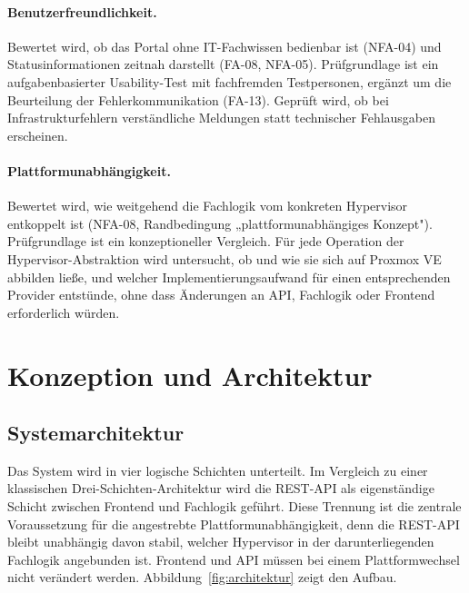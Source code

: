 \documentclass[12pt,a4paper]{article}
\begin{document}
\paragraph{Benutzerfreundlichkeit.} Bewertet wird, ob das Portal ohne IT-Fachwissen bedienbar ist (NFA-04) und Statusinformationen zeitnah darstellt (FA-08, NFA-05). Prüfgrundlage ist ein aufgabenbasierter Usability-Test mit fachfremden Testpersonen, ergänzt um die Beurteilung der Fehlerkommunikation (FA-13). Geprüft wird, ob bei Infrastrukturfehlern verständliche Meldungen statt technischer Fehlausgaben erscheinen.

\paragraph{Plattformunabhängigkeit.} Bewertet wird, wie weitgehend die Fachlogik vom konkreten Hypervisor entkoppelt ist (NFA-08, Randbedingung „plattformunabhängiges Konzept"). Prüfgrundlage ist ein konzeptioneller Vergleich. Für jede Operation der Hypervisor-Abstraktion wird untersucht, ob und wie sie sich auf Proxmox VE abbilden ließe, und welcher Implementierungsaufwand für einen entsprechenden Provider entstünde, ohne dass Änderungen an API, Fachlogik oder Frontend erforderlich würden.

\newpage
\section{Konzeption und Architektur}

\subsection{Systemarchitektur}
\label{sec:systemarchitektur}

Das System wird in vier logische Schichten unterteilt. Im Vergleich zu einer klassischen Drei-Schichten-Architektur wird die REST-API \parencite{fielding2000rest} als eigenständige Schicht zwischen Frontend und Fachlogik geführt. Diese Trennung ist die zentrale Voraussetzung für die angestrebte Plattformunabhängigkeit, denn die REST-API bleibt unabhängig davon stabil, welcher Hypervisor in der darunterliegenden Fachlogik angebunden ist. Frontend und API müssen bei einem Plattformwechsel nicht verändert werden. Abbildung~\ref{fig:architektur} zeigt den Aufbau.
\end{document}
